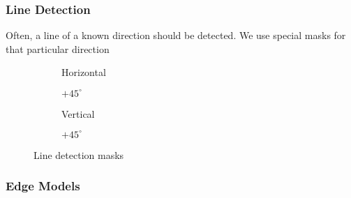 \subsubsection{Line Detection}
Often, a line of a known direction should be detected. We use special masks for that particular direction
\begin{figure}[h]
	\centering
	\begin{subfigure}[b]{0.2\textwidth}
		\centering
		\caption{Horizontal}
	\end{subfigure}
	\begin{subfigure}[b]{0.2\textwidth}
		\centering
		\caption{$+45^\circ$}
	\end{subfigure}
	\begin{subfigure}[b]{0.2\textwidth}
		\centering
		\caption{Vertical}
	\end{subfigure}
	\begin{subfigure}[b]{0.2\textwidth}
		\centering
		\caption{$+45^\circ$}
	\end{subfigure}
	\caption{Line detection masks}
\end{figure}

\subsubsection{Edge Models}
